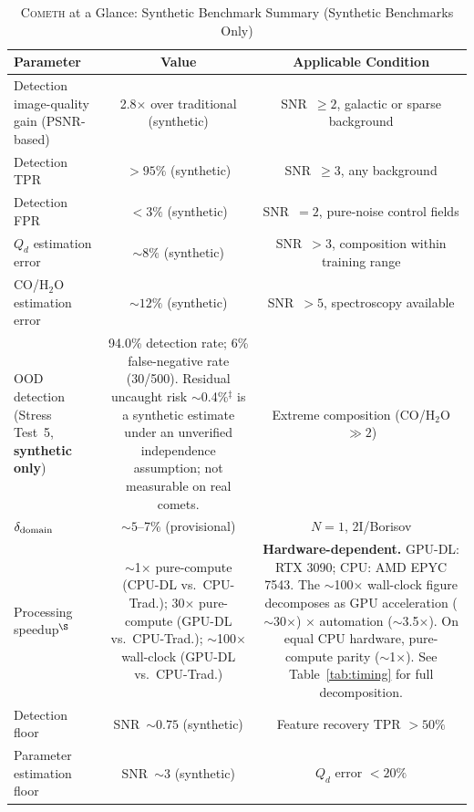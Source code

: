 \documentclass[usenatbib]{mnras}
\begin{document}
\vspace{4pt}
\begin{table}
\centering
\caption{\textsc{Cometh} at a Glance: Synthetic Benchmark Summary (Synthetic Benchmarks Only)}\label{tab:key_numbers}
\begin{tabular}{lcc}
\toprule
Parameter & Value & Applicable Condition \\
\midrule
Detection image-quality gain (PSNR-based) & 2.8$\times$ over traditional (synthetic) & SNR~$\geq 2$, galactic or sparse background \\
Detection TPR & $>95\%$ (synthetic) & SNR~$\geq 3$, any background \\
Detection FPR & $<3\%$ (synthetic) & SNR~$=2$, pure-noise control fields \\
$Q_d$ estimation error & $\sim 8\%$ (synthetic) & SNR~$>3$, composition within training range \\
CO/H$_2$O estimation error & $\sim 12\%$ (synthetic) & SNR~$>5$, spectroscopy available \\
OOD detection (Stress Test~5, \textbf{synthetic only}) & 94.0\% detection rate; 6\% false-negative rate (30/500). Residual uncaught risk $\sim$0.4\%$^\ddagger$ is a synthetic estimate under an unverified independence assumption; not measurable on real comets. & Extreme composition (CO/H$_2$O $\gg 2$) \\
$\delta_{\rm domain}$ & $\sim 5$--7\% (provisional) & $N=1$, 2I/Borisov \\
Processing speedup$^\S$ & $\sim$1$\times$ pure-compute (CPU-DL vs.\ CPU-Trad.); 30$\times$ pure-compute (GPU-DL vs.\ CPU-Trad.); $\sim$100$\times$ wall-clock (GPU-DL vs.\ CPU-Trad.) & \textbf{Hardware-dependent.} GPU-DL: RTX 3090; CPU: AMD EPYC 7543. The $\sim$100$\times$ wall-clock figure decomposes as GPU acceleration ($\sim$30$\times$) $\times$ automation ($\sim$3.5$\times$). On equal CPU hardware, pure-compute parity ($\sim$1$\times$). See Table~\ref{tab:timing} for full decomposition. \\
Detection floor & SNR~$\sim 0.75$ (synthetic) & Feature recovery TPR $>50\%$ \\
Parameter estimation floor & SNR~$\sim 3$ (synthetic) & $Q_d$ error $<20\%$ \\
\bottomrule
\end{tabular}

\end{table}
\end{document}

